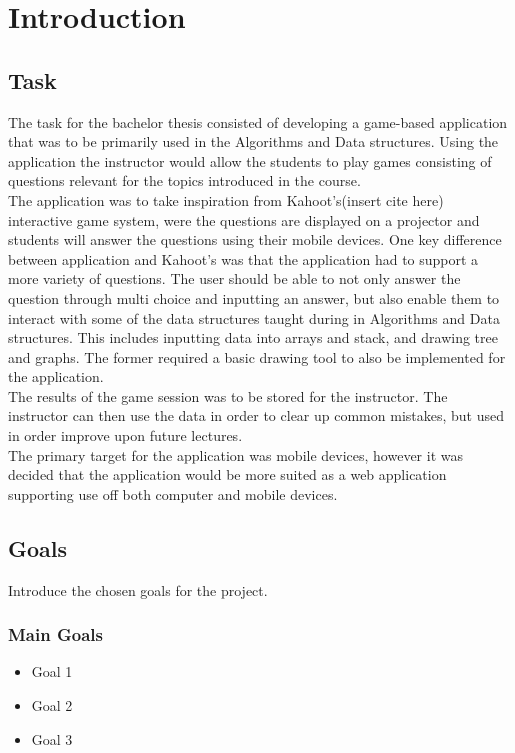\section{Introduction}
\subsection{Task}
The task for the bachelor thesis consisted of developing a game-based application that was to be primarily used in the Algorithms and Data structures. Using the application the instructor would allow the students to play games consisting of questions relevant for the topics introduced in the course.
\\[11pt]
The application was to take inspiration from Kahoot's(insert cite here) interactive game system, were the questions are displayed on a projector and students will answer the questions using their mobile devices. One key difference between application and Kahoot's was that the application had to support a more variety of questions. The user should be able to not only answer the question through multi choice and inputting an answer, but also enable them to interact with some of the data structures taught during in Algorithms and Data structures. This includes inputting data into arrays and stack, and drawing tree and graphs. The former required a basic drawing tool to also be implemented for the application.
\\[11pt] 
The results of the game session was to be stored for the instructor. The instructor can then use the data in order to clear up common mistakes, but used in order improve upon future lectures.
\\[11pt]
The primary target for the application was mobile devices, however it was decided that the application would be more suited as a web application supporting use off both computer and mobile devices. 

\subsection{Goals}
Introduce the chosen goals for the project.
\subsubsection{Main Goals}
\begin{itemize}
\item Goal 1
\item Goal 2
\item Goal 3
\end{itemize}
